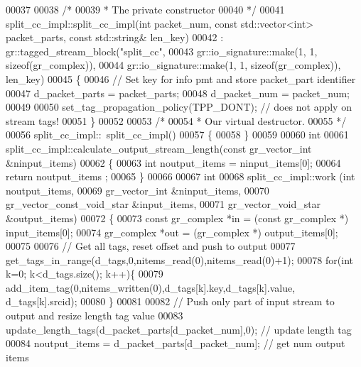 \begin{DoxyCode}
00037 
00038     \textcolor{comment}{/*}
00039 \textcolor{comment}{     * The private constructor}
00040 \textcolor{comment}{     */}
00041     split_cc_impl::split_cc_impl(\textcolor{keywordtype}{int} packet\_num, \textcolor{keyword}{const} std::vector<int> packet\_parts, \textcolor{keyword}{const} 
      std::string& len\_key)
00042       : gr::tagged\_stream\_block(\textcolor{stringliteral}{"split\_cc"},
00043               gr::io\_signature::make(1, 1, sizeof(gr\_complex)),
00044               gr::io\_signature::make(1, 1, sizeof(gr\_complex)), len\_key)
00045     \{
00046         \textcolor{comment}{// Set key for info pmt and store packet\_part identifier}
00047         d_packet_parts = packet\_parts;
00048         d_packet_num = packet\_num;
00049 
00050         set\_tag\_propagation\_policy(TPP\_DONT); \textcolor{comment}{// does not apply on stream tags!}
00051     \}
00052 
00053     \textcolor{comment}{/*}
00054 \textcolor{comment}{     * Our virtual destructor.}
00055 \textcolor{comment}{     */}
00056     split_cc_impl::~split_cc_impl()
00057     \{
00058     \}
00059 
00060     \textcolor{keywordtype}{int}
00061     split_cc_impl::calculate_output_stream_length(\textcolor{keyword}{const} gr\_vector\_int &ninput\_items)
00062     \{
00063       \textcolor{keywordtype}{int} noutput\_items = ninput\_items[0];
00064       \textcolor{keywordflow}{return} noutput\_items ;
00065     \}
00066 
00067     \textcolor{keywordtype}{int}
00068     split_cc_impl::work (\textcolor{keywordtype}{int} noutput\_items,
00069                        gr\_vector\_int &ninput\_items,
00070                        gr\_vector\_const\_void\_star &input\_items,
00071                        gr\_vector\_void\_star &output\_items)
00072     \{
00073         \textcolor{keyword}{const} gr\_complex *in = (\textcolor{keyword}{const} gr\_complex *) input\_items[0];
00074         gr\_complex *out = (gr\_complex *) output\_items[0];
00075 
00076         \textcolor{comment}{// Get all tags, reset offset and push to output}
00077         get\_tags\_in\_range(d_tags,0,nitems\_read(0),nitems\_read(0)+1);
00078         \textcolor{keywordflow}{for}(\textcolor{keywordtype}{int} k=0; k<d_tags.size(); k++)\{
00079             add\_item\_tag(0,nitems\_written(0),d_tags[k].key,d_tags[k].value,
      d_tags[k].srcid);
00080         \}
00081 
00082         \textcolor{comment}{// Push only part of input stream to output and resize length tag value}
00083         update\_length\_tags(d_packet_parts[d_packet_num],0); \textcolor{comment}{// update length tag}
00084         noutput\_items = d_packet_parts[d_packet_num]; \textcolor{comment}{// get num output items}

\end{DoxyCode}
